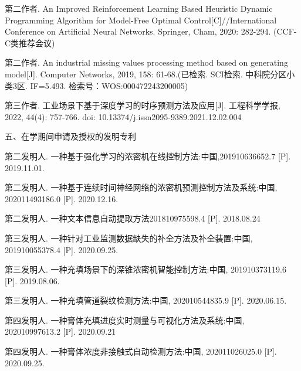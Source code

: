 \begin{enumerate}[label={[\arabic*]}]
\item 第二作者. An Improved Reinforcement Learning Based Heuristic Dynamic Programming Algorithm for Model-Free Optimal Control[C]//International Conference on Artificial Neural Networks. Springer, Cham, 2020: 282-294. (CCF-C类推荐会议) 
\item 第二作者. An industrial missing values processing method based on generating model[J]. Computer Networks, 2019, 158: 61-68.(已检索. SCI检索. 中科院分区小类3区. IF=5.493. 检索号：WOS:000472243200005)
\item 第三作者. 工业场景下基于深度学习的时序预测方法及应用[J]. 工程科学学报, 2022, 44(4): 757-766. doi: 10.13374/j.issn2095-9389.2021.12.02.004
\end{enumerate}
\par
\noindent 五、在学期间申请及授权的发明专利 \par

\begin{enumerate}[label={[\arabic*]}]  %
 \item 第二发明人. 一种基于强化学习的浓密机在线控制方法:中国,201910636652.7 [P]. 2019.11.01. 
 \item 第二发明人. 一种基于连续时间神经网络的浓密机预测控制方法及系统:中国, 202011493186.0 [P]. 2020.12.16. 
\item 第二发明人. 一种文本信息自动提取方法201810975598.4 [P]. 2018.08.24 
\item 第三发明人. 一种针对工业监测数据缺失的补全方法及补全装置:中国, 201910055378.4 [P]. 2020.09.25. 
 \item 第三发明人. 一种充填场景下的深锥浓密机智能控制方法:中国, 201910373119.6 [P]. 2019.08.06. 
 \item 第三发明人. 一种充填管道裂纹检测方法:中国, 202010544835.9 [P]. 2020.06.15.
\item 第四发明人. 一种膏体充填进度实时测量与可视化方法及系统:中国, 202010997613.2 [P]. 2020.09.21 
\item 第四发明人. 一种膏体浓度非接触式自动检测方法:中国, 202011026025.0 [P]. 2020.09.25. 
\end{enumerate}

